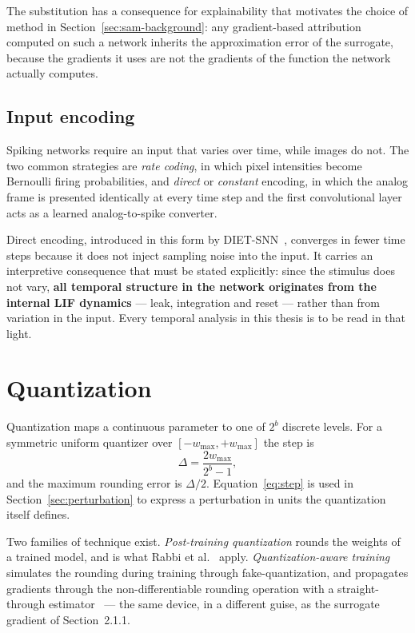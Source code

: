 The substitution has a consequence for explainability that motivates the choice
of method in Section~\ref{sec:sam-background}: any gradient-based attribution
computed on such a network inherits the approximation error of the surrogate,
because the gradients it uses are not the gradients of the function the network
actually computes.

\subsection{Input encoding}

Spiking networks require an input that varies over time, while images do not. The
two common strategies are \emph{rate coding}, in which pixel intensities become
Bernoulli firing probabilities, and \emph{direct} or \emph{constant} encoding, in
which the analog frame is presented identically at every time step and the first
convolutional layer acts as a learned analog-to-spike converter.

Direct encoding, introduced in this form by DIET-SNN~\cite{rathi2023dietsnn},
converges in fewer time steps because it does not inject sampling noise into the
input. It carries an interpretive consequence that must be stated explicitly:
since the stimulus does not vary, \textbf{all temporal structure in the network
originates from the internal LIF dynamics} --- leak, integration and reset ---
rather than from variation in the input. Every temporal analysis in this thesis
is to be read in that light.

\section{Quantization}

Quantization maps a continuous parameter to one of $2^b$ discrete levels. For a
symmetric uniform quantizer over $[-w_{\max}, +w_{\max}]$ the step is
\begin{equation}
\Delta = \frac{2 w_{\max}}{2^b - 1},
\label{eq:step}
\end{equation}
and the maximum rounding error is $\Delta/2$. Equation~\ref{eq:step} is used in
Section~\ref{sec:perturbation} to express a perturbation in units the
quantization itself defines.

Two families of technique exist. \emph{Post-training quantization} rounds the
weights of a trained model, and is what Rabbi et al.~\cite{rabbi2026} apply.
\emph{Quantization-aware training} simulates the rounding during training through
fake-quantization, and propagates gradients through the non-differentiable
rounding operation with a straight-through estimator~\cite{bengio2013ste} ---
the same device, in a different guise, as the surrogate gradient of
Section~2.1.1.

